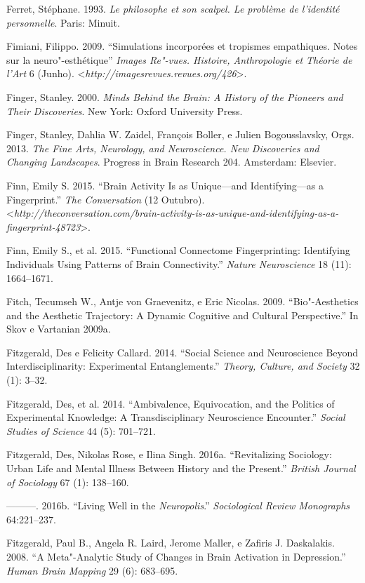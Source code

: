 Ferret, Stéphane. 1993. \emph{Le philosophe et son scalpel. Le problème
de l'identité personnelle}. Paris: Minuit.

Fimiani, Filippo. 2009. ``Simulations incorporées et tropismes
empathiques. Notes sur la neuro"-esthétique'' \emph{Images Re"-vues.
Histoire, Anthropologie et Théorie de l'Art} 6 (Junho).
\textless{}\emph{http://imagesrevues.revues.org/426}\textgreater{}.

Finger, Stanley. 2000. \emph{Minds Behind the Brain: A History of the
Pioneers and Their Discoveries}. New York: Oxford University Press.

Finger, Stanley, Dahlia W. Zaidel, François Boller, e Julien
Bogousslavsky, Orgs. 2013. \emph{The Fine Arts, Neurology, and
Neuroscience. New Discoveries and Changing Landscapes}. Progress in
Brain Research 204. Amsterdam: Elsevier.

Finn, Emily S. 2015. ``Brain Activity Is as Unique---and
Identifying---as a Fingerprint.'' \emph{The Conversation} (12 Outubro).
\textless{}\emph{http://theconversation.com/brain-activity-is-as-unique-and-identifying-as-a-fingerprint-48723}\textgreater{}.

Finn, Emily S., et al. 2015. ``Functional Connectome Fingerprinting:
Identifying Individuals Using Patterns of Brain Connectivity.''
\emph{Nature Neuroscience} 18 (11): 1664--1671.

Fitch, Tecumseh W., Antje von Graevenitz, e Eric Nicolas. 2009.
``Bio"-Aesthetics and the Aesthetic Trajectory: A Dynamic Cognitive and
Cultural Perspective.'' In Skov e Vartanian 2009a.

Fitzgerald, Des e Felicity Callard. 2014. ``Social Science and
Neuroscience Beyond Interdisciplinarity: Experimental Entanglements.''
\emph{Theory, Culture, and Society} 32 (1): 3--32.

Fitzgerald, Des, et al. 2014. ``Ambivalence, Equivocation, and the
Politics of Experimental Knowledge: A Transdisciplinary Neuroscience
Encounter.'' \emph{Social Studies of Science} 44 (5): 701--721.

Fitzgerald, Des, Nikolas Rose, e Ilina Singh. 2016a. ``Revitalizing
Sociology: Urban Life and Mental Illness Between History and the
Present.'' \emph{British Journal of Sociology} 67 (1): 138--160.

---------. 2016b. ``Living Well in the \emph{Neuropolis}.''
\emph{Sociological Review Monographs} 64:221--237.

Fitzgerald, Paul B., Angela R. Laird, Jerome Maller, e Zafiris J.
Daskalakis. 2008. ``A Meta"-Analytic Study of Changes in Brain Activation
in Depression.'' \emph{Human Brain Mapping} 29 (6): 683--695.

